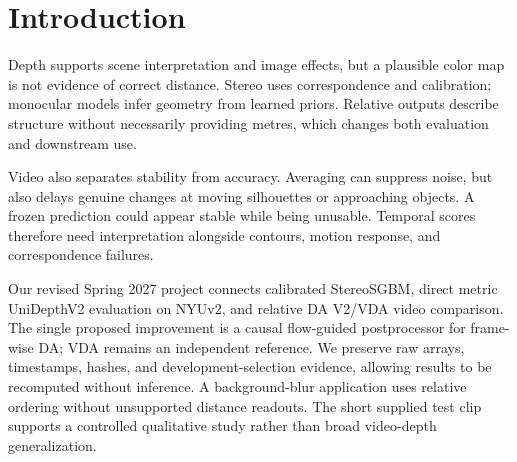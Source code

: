 \section{Introduction}
Depth supports scene interpretation and image effects, but a plausible color map is not evidence of correct distance. Stereo uses correspondence and calibration; monocular models infer geometry from learned priors. Relative outputs describe structure without necessarily providing metres, which changes both evaluation and downstream use.

Video also separates stability from accuracy. Averaging can suppress noise, but also delays genuine changes at moving silhouettes or approaching objects. A frozen prediction could appear stable while being unusable. Temporal scores therefore need interpretation alongside contours, motion response, and correspondence failures.

Our revised Spring 2027 project connects calibrated StereoSGBM, direct metric UniDepthV2 evaluation on NYUv2, and relative DA V2/VDA video comparison. The single proposed improvement is a causal flow-guided postprocessor for frame-wise DA; VDA remains an independent reference. We preserve raw arrays, timestamps, hashes, and development-selection evidence, allowing results to be recomputed without inference. A background-blur application uses relative ordering without unsupported distance readouts. The short supplied test clip supports a controlled qualitative study rather than broad video-depth generalization.
